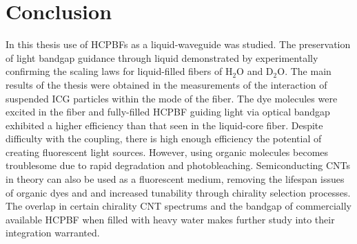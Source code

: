 \chapter{Conclusion}
In this thesis use of  HCPBFs as a liquid-waveguide was studied. The preservation of light bandgap guidance through liquid demonstrated by experimentally confirming the scaling laws for liquid-filled fibers of H${}_2$O and D${}_2$O.
The main results of the thesis were obtained in the measurements of the interaction of suspended ICG particles within the mode of the fiber. The dye molecules were excited in the fiber and fully-filled HCPBF guiding light via optical bandgap exhibited a higher efficiency than that seen in the liquid-core fiber. Despite difficulty with the coupling, there is high enough efficiency the potential of creating fluorescent light sources. However, using organic molecules becomes troublesome due to rapid degradation and photobleaching. Semiconducting CNTs in theory can also be used as a fluorescent medium, removing the lifespan issues of organic dyes and and increased tunability through chirality selection processes. The overlap in certain chirality CNT spectrums and the bandgap of commercially available HCPBF when filled with heavy water makes further study into their integration warranted. 